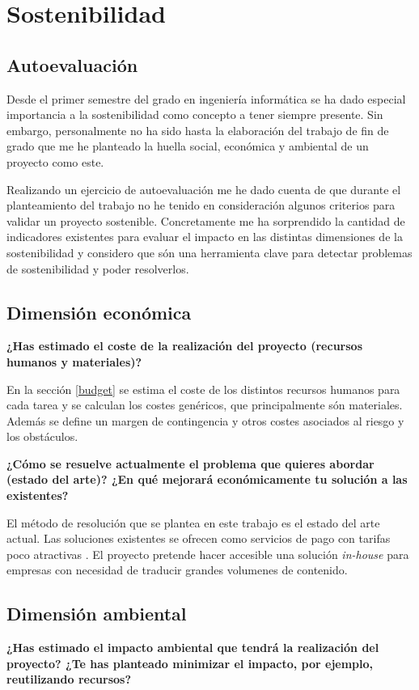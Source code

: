 \chapter{Sostenibilidad}
\section{Autoevaluación}
Desde el primer semestre del grado en ingeniería informática se ha dado especial importancia a
la sostenibilidad como concepto a tener siempre presente. Sin embargo, personalmente no ha sido hasta
la elaboración del trabajo de fin de grado que me he planteado la huella social, económica y 
ambiental de un proyecto como este.

Realizando un ejercicio de autoevaluación me he dado cuenta de que durante el planteamiento del
trabajo no he tenido en consideración algunos criterios para validar un
proyecto sostenible. Concretamente me ha sorprendido la cantidad de indicadores existentes
para evaluar el impacto en las distintas dimensiones de la sostenibilidad y considero que
són una herramienta clave para detectar problemas de sostenibilidad y poder resolverlos.

\section{Dimensión económica}
\textbf{¿Has estimado el coste de la realización del proyecto (recursos humanos y materiales)?}

En la sección \ref{budget} se estima el coste de los distintos recursos humanos para cada
tarea y se calculan los costes genéricos, que principalmente són materiales.
Además se define un margen de contingencia y otros costes asociados al riesgo y los obstáculos.

\textbf{¿Cómo se resuelve actualmente el problema que quieres abordar (estado del arte)?
¿En qué mejorará económicamente tu solución a las existentes?}

El método de resolución que se plantea en este trabajo es el estado del arte actual.
Las soluciones existentes se ofrecen como servicios de pago con tarifas poco atractivas
\cite{GoogleTranslatePricing,AWSTranslatePricing,MicrosoftTranslatePricing}. El proyecto pretende
hacer accesible una solución \textit{in-house} para empresas con necesidad de traducir grandes
volumenes de contenido.

\section{Dimensión ambiental}
\textbf{¿Has estimado el impacto ambiental que tendrá la realización del proyecto? ¿Te has
planteado minimizar el impacto, por ejemplo, reutilizando recursos?}

